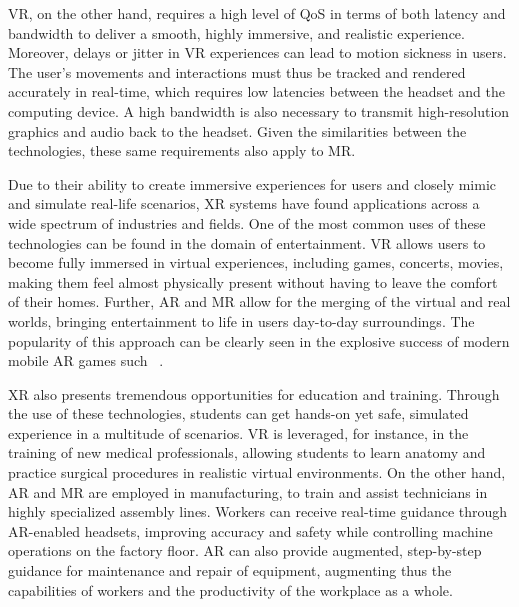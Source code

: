 \gls{VR}, on the other hand, requires a high level of \gls{QoS} in terms of both latency and bandwidth to deliver a smooth, highly immersive, and realistic experience.
Moreover, delays or jitter in \gls{VR} experiences can lead to motion sickness in users.
The user's movements and interactions must thus be tracked and rendered accurately in real-time, which requires low latencies between the headset and the computing device.
A high bandwidth is also necessary to transmit high-resolution graphics and audio back to the headset.
Given the similarities between the technologies, these same requirements also apply to \gls{MR}.

\medskip

Due to their ability to create immersive experiences for users and closely mimic and simulate real-life scenarios, \gls{XR} systems have found applications across a wide spectrum of industries and fields.
One of the most common uses of these technologies can be found in the domain of entertainment.
\gls{VR} allows users to become fully immersed in virtual experiences, including games, concerts, movies, making them feel almost physically present without having to leave the comfort of their homes.
Further, \gls{AR} and \gls{MR} allow for the merging of the virtual and real worlds, bringing entertainment to life in users day-to-day surroundings.
The popularity of this approach can be clearly seen in the explosive success of modern mobile \gls{AR} games such ~\cite{pokemongo}.

\gls{XR} also presents tremendous opportunities for education and training.
Through the use of these technologies, students can get hands-on yet safe, simulated experience in a multitude of scenarios.
\gls{VR} is leveraged, for instance, in the training of new medical professionals, allowing students to learn anatomy and practice surgical procedures in realistic virtual environments.
On the other hand, \gls{AR} and \gls{MR} are employed in manufacturing, to train and assist technicians in highly specialized assembly lines.
Workers can receive real-time guidance through \gls{AR}-enabled headsets, improving accuracy and safety while controlling machine operations on the factory floor.
\gls{AR} can also provide augmented, step-by-step guidance for maintenance and repair of equipment, augmenting thus the capabilities of workers and the productivity of the workplace as a whole.

\paragraph{}\label{sec:background:wca}

